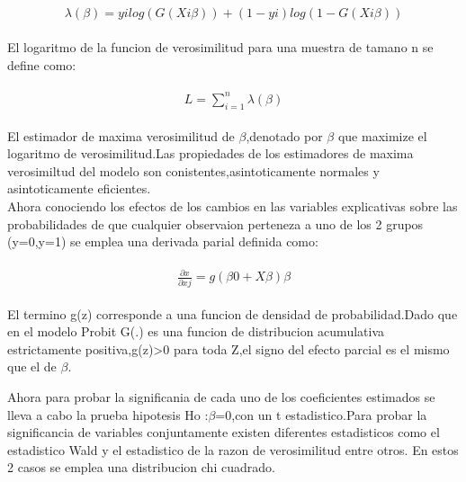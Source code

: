 \documentclass[11pt,fleqn]{book} %
\numberwithin{equation}{section} %
\numberwithin{figure}{section} %
\numberwithin{table}{section} %
\begin{document}
\begin{align} 
\begin{split}
\lambda(\beta)= yi log(G(Xi\beta)) + (1-yi)log(1-G(Xi\beta))
\end{split}					
\end{align}

El logaritmo de la funcion de verosimilitud para una muestra de tamano n se define como:  

\begin{align} 
\begin{split}
L= \sum_{i=1}^{n} \lambda(\beta)
\end{split}					
\end{align}

El estimador de maxima verosimilitud de $\beta$,denotado por $\beta$  que maximize el logaritmo de verosimilitud.Las propiedades de los estimadores de maxima verosimiltud del modelo son conistentes,asintoticamente normales y asintoticamente eficientes.
\\
Ahora conociendo los efectos de los cambios en las variables explicativas sobre las probabilidades de que cualquier observaion perteneza a uno de los 2 grupos (y=0,y=1) se emplea una derivada parial definida como:

\begin{align} 
\begin{split}
\frac{\partial x }{\partial xj} = g(\beta 0 +X\beta )\beta
\end{split}					
\end{align}


El termino g(z) corresponde a una funcion de densidad de probabilidad.Dado que en el modelo Probit G(.) es una funcion de distribucion acumulativa estrictamente positiva,g(z)>0 para toda Z,el signo del efecto parcial es el mismo que el de $\beta$.


Ahora para probar la significania de cada uno de los coeficientes estimados se lleva a cabo la prueba hipotesis Ho :$\beta$=0,con un t estadistico.Para probar la significancia de variables conjuntamente existen diferentes estadisticos como el estadistico Wald y el estadistico de la razon de verosimilitud entre otros. En estos 2 casos se emplea una distribucion chi cuadrado.
\end{document}
